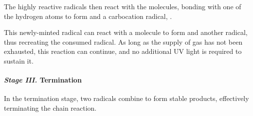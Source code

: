 					The highly reactive \ch{\chlorine} radicals then react with the  molecules, bonding with one of the
					hydrogen atoms to form  and a carbocation radical, .


					This newly-minted  radical can react with a  molecule to form  and another
					\ch{\chlorine} radical, thus recreating the consumed radical. As long as the supply of  gas has
					not been exhausted, this reaction can continue, and no additional UV light is required to sustain it.


				\pagebreak
				\paragraph{\textit{Stage III.}\hspace{5mm} Termination}

					In the termination stage, two radicals combine to form stable products, effectively terminating the chain reaction.


